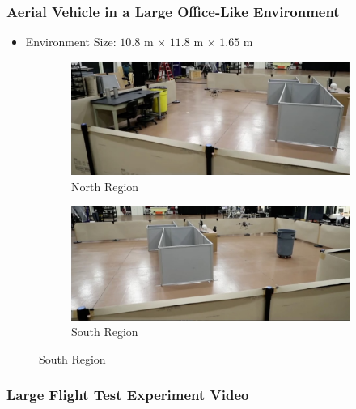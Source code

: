 \documentclass[11pt,professionalfonts,hyperref={pdftex,pdfpagemode=none,pdfstartview=FitH}]{beamer}
\begin{document}
\begin{frame}
\frametitle{Aerial Vehicle in a Large Office-Like Environment}
\begin{itemize}
        	\item Environment Size: $10.8$ m $\times$ $11.8$ m $\times$ $1.65$ m
\end{itemize}
\begin{figure}
  \centering
  \begin{subfigure}[t]{.4\linewidth}
    \centering\includegraphics[width=\linewidth]{experiment_north.jpg}
    \caption*{North Region}
  \end{subfigure}
  \begin{subfigure}[t]{.4\linewidth}
    \centering\includegraphics[width=\linewidth]{experiment_south.jpg}
    \caption*{South Region}
  \end{subfigure}
\end{figure}
\end{frame}


\begin{frame}
\frametitle{Large Flight Test Experiment Video}




\end{frame}
\end{document}

